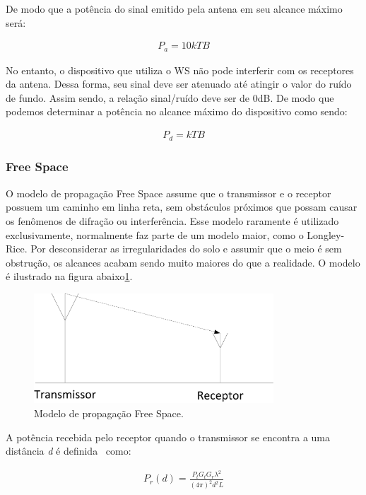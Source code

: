 De modo que a potência do sinal emitido pela antena em seu alcance máximo será:

\begin{align}
  \label{minPotAnt} P_{a}= 10kTB
\end{align}

 No entanto, o dispositivo que utiliza o WS não pode interferir com os receptores da antena. Dessa forma, seu sinal deve ser atenuado até atingir o valor do ruído de fundo. Assim sendo, a relação sinal/ruído deve ser de 0dB. De modo que podemos determinar a potência no alcance máximo do dispositivo como sendo:

\begin{align}
  \label{minPotDev} P_{d}=  kTB
\end{align}

\subsubsection{Free Space}

O modelo de propagação Free Space assume que o transmissor e o receptor possuem um caminho em linha reta, sem obstáculos próximos que possam causar os fenômenos de difração ou interferência. Esse modelo raramente é utilizado exclusivamente, normalmente faz parte de um modelo maior, como o Longley-Rice. Por desconsiderar as irregularidades do solo e assumir que o meio é sem obstrução, os alcances acabam sendo muito maiores do que a realidade. O modelo é ilustrado na figura abaixo\ref{fig:freespaces}.

\begin{figure}[htb]
\centering
\includegraphics[width=0.8\textwidth]{figs/freespaces}
\caption[Modelo de propagação Free Space.]
{Modelo de propagação Free Space.}
\label{fig:freespaces}
\end{figure}

A potência recebida pelo receptor quando o transmissor se encontra a uma distância \textit{d} é definida~\cite{rapapport} como: 

\begin{align}
  \label{potfree} P_r(d) =\frac{ P_tG_tG_r\lambda^{2}}{(4\pi)^{2}d^{2}L}
\end{align}

